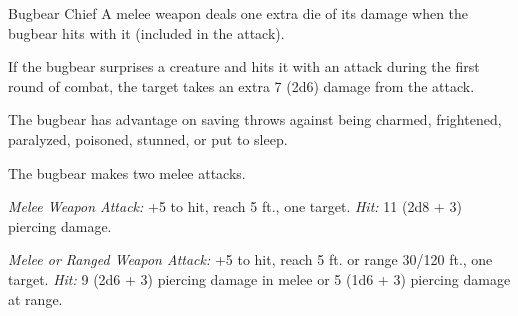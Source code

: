 \documentclass[10pt,a4paper,twoside,twocolumn,openany,nodeprecatedcode]{dndbook}
\begin{document}
\begin{DndMonster}[float=ht]{Bugbear Chief}
\DndMonsterBasics[
armor-class = {17 (chain shirt)},
hit-points = {\DndDice{10d8 + 20}},
speed = {30 ft.}
]
\DndMonsterAbilityScores[
 str = 17,
 dex = 14,
 con = 14,
 int = 11,
 wis = 12,
 cha = 11
]
\DndMonsterDetails[
skills = {Intimidation +2, Stealth +6, Survival +3},
senses = {darkvision 60 ft., passive perception 11},
languages = {Common, Goblin},
challenge = 3,
]
A melee weapon deals one extra die of its damage when the bugbear hits with it (included in the attack).

If the bugbear surprises a creature and hits it with an attack during the first round of combat, the target takes an extra 7 (2d6) damage from the attack.

The bugbear has advantage on saving throws against being charmed, frightened, paralyzed, poisoned, stunned, or put to sleep.

\par
{}
The bugbear makes two melee attacks.

\textsl{Melee Weapon Attack:} +5 to hit, reach 5 ft., one target. \textsl{Hit:} 11 (2d8 + 3) piercing damage.

\textsl{Melee or Ranged Weapon Attack:} +5 to hit, reach 5 ft. or range 30/120 ft., one target. \textsl{Hit:} 9 (2d6 + 3) piercing damage in melee or 5 (1d6 + 3) piercing damage at range.

\end{DndMonster}


\clearpage
{}
\end{document}
